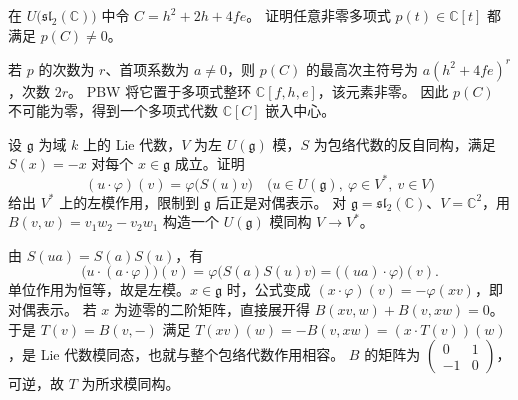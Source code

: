 \begin{exercise}\label{b5:ex:15-casimir-transcendence}
	在 \(U\bigl(\mathfrak{sl}_2(\mathbb C)\bigr)\) 中令 \(C=h^2+2h+4fe\)。 证明任意非零多项式 \(p(t)\in\mathbb C[t]\) 都满足 \(p(C)\ne0\)。
\end{exercise}
\begin{solution}
	若 \(p\) 的次数为 \(r\)、首项系数为 \(a\ne0\)，则 \(p(C)\) 的最高次主符号为 \(a(h^2+4fe)^r\)，次数 \(2r\)。 PBW 将它置于多项式整环 \(\mathbb C[f,h,e]\)，该元素非零。 因此 \(p(C)\) 不可能为零，得到一个多项式代数 \(\mathbb C[C]\) 嵌入中心。
\end{solution}

\begin{exercise}\label{b5:ex:15-enveloping-antiautomorphism}
	设 \(\mathfrak g\) 为域 \(k\) 上的 Lie 代数，\(V\) 为左 \(U(\mathfrak g)\) 模，\(S\) 为包络代数的反自同构，满足 \(S(x)=-x\) 对每个 \(x\in\mathfrak g\) 成立。证明
	\[
		(u\cdot\varphi)(v)=\varphi\bigl(S(u)v\bigr) \quad\bigl(u\in U(\mathfrak g),\ \varphi\in V^*,\ v\in V\bigr)
	\]
	给出 \(V^*\) 上的左模作用，限制到 \(\mathfrak g\) 后正是对偶表示。 对 \(\mathfrak g=\mathfrak{sl}_2(\mathbb C)\)、\(V=\mathbb C^2\)，用 \(B(v,w)=v_1w_2-v_2w_1\) 构造一个 \(U(\mathfrak g)\) 模同构 \(V\to V^*\)。
\end{exercise}
\begin{solution}
	由 \(S(ua)=S(a)S(u)\)，有
	\[
		\bigl(u\cdot(a\cdot\varphi)\bigr)(v) =\varphi\bigl(S(a)S(u)v\bigr) =\bigl((ua)\cdot\varphi\bigr)(v).
	\]
	单位作用为恒等，故是左模。\(x\in\mathfrak g\) 时，公式变成 \((x\cdot\varphi)(v)=-\varphi(xv)\)，即对偶表示。 若 \(x\) 为迹零的二阶矩阵，直接展开得 \(B(xv,w)+B(v,xw)=0\)。于是 \(T(v)=B(v,-)\) 满足 \(T(xv)(w)=-B(v,xw)=(x\cdot T(v))(w)\)，是 Lie 代数模同态，也就与整个包络代数作用相容。
	\(B\) 的矩阵为 \(\left(\begin{smallmatrix}0&1\\-1&0\end{smallmatrix}\right)\)，可逆，故 \(T\) 为所求模同构。
\end{solution}


